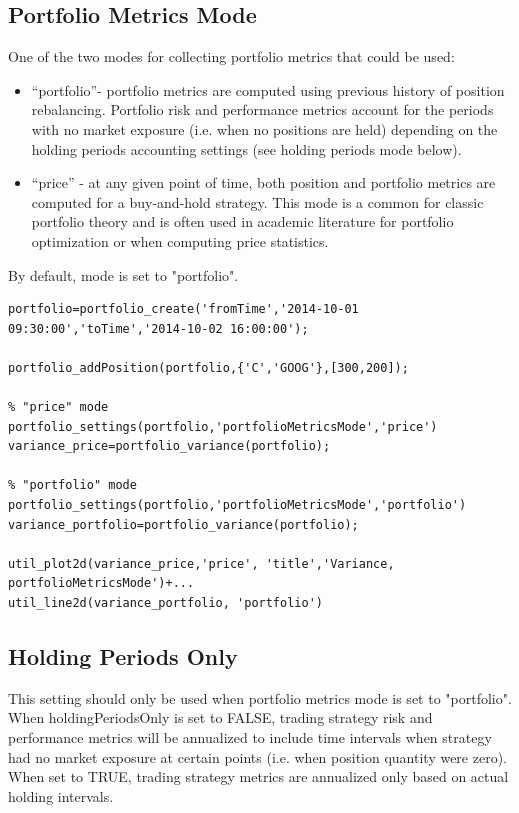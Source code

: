 \documentclass[letterpaper]{report}
\begin{document}
\subsection {Portfolio Metrics Mode}
One of the two modes for collecting portfolio metrics that could be used:
\begin{itemize} 					
	\item ``portfolio''- portfolio metrics are computed using previous history of position rebalancing.
						 Portfolio risk and performance metrics account for the periods with no
						 market exposure (i.e. when no positions are held) depending on the
						 holding periods accounting settings (see holding periods mode below).
	\item ``price'' -    at any given point of time, both position and portfolio
						 metrics are computed for a buy-and-hold strategy. 
						 This mode is a common for classic portfolio theory and is often used in
						 academic literature for portfolio optimization or when computing price
						 statistics.
\end{itemize}
By default, mode is set to "portfolio".
\begin{lstlisting}
portfolio=portfolio_create('fromTime','2014-10-01 09:30:00','toTime','2014-10-02 16:00:00');
						   
portfolio_addPosition(portfolio,{'C','GOOG'},[300,200]);

% "price" mode
portfolio_settings(portfolio,'portfolioMetricsMode','price')
variance_price=portfolio_variance(portfolio);

% "portfolio" mode
portfolio_settings(portfolio,'portfolioMetricsMode','portfolio')
variance_portfolio=portfolio_variance(portfolio);

util_plot2d(variance_price,'price', 'title','Variance, portfolioMetricsMode')+...
util_line2d(variance_portfolio, 'portfolio')
\end{lstlisting}

\subsection {Holding Periods Only}
This setting should only be used when portfolio metrics mode is set to "portfolio".
When holdingPeriodsOnly is set to FALSE, trading strategy risk and performance
metrics will be annualized to include time intervals when strategy had no market exposure at certain points (i.e. when position quantity were zero).
When set to TRUE, trading strategy metrics are annualized only based on actual holding intervals.
\end{document}
